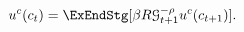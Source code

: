   \begin{equation}\begin{gathered}\begin{aligned}
        \uFunc^{{c}}({c}_{\prd})  & = \ExEndStg[\DiscFac\Rfree \PermGroFac_{\prd+1}^{-\CRRA}\uFunc^{{c}}({c}_{\prd+1})] \label{eq:cEuler}.
      \end{aligned}\end{gathered}\end{equation}
